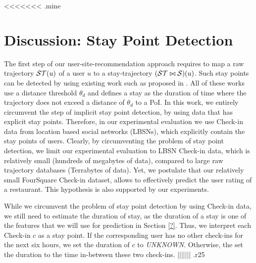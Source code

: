 <<<<<<< .mine
\section{Discussion: Stay Point Detection}\label{sec:stay}
The first step of our user-site-recommendation approach requires to map a raw trajectory $\mathcal{ST}(u)$ of a user $u$ to a stay-trajectory $(\mathcal{ST}\bowtie\mathcal{S})(u)$. Such stay points can be detected by using existing work such as proposed in \cite{li2008mining,zheng2009mining,zheng2010geolife,xiao2010finding}. All of these works use a distance threshold $\theta_{d}$ and defines a stay as the duration of time where the trajectory does not exceed a distance of $\theta_{d}$ to a PoI. In this work, we entirely circumvent the step of implicit stay point detection, by using data that has explicit stay points. Therefore, in our experimental evaluation we use Check-in data from location based social networks (LBSNs), which explicitly contain the stay points of users. Clearly, by circumventing the problem of stay point detection, we limit our experimental evaluation to LBSN Check-in data, which is relatively small (hundreds of megabytes of data), compared to large raw trajectory databases (Terrabytes of data).
Yet, we postulate that our relatively small FourSquare Check-in dataset, allows to effectively predict the user rating of a restaurant. This hypothesis is also supported by our experiments.

While we circumvent the problem of stay point detection by using Check-in data, we still need to estimate the duration of stay, as the duration of a stay is one of the features that we will use for prediction in Section \ref{?}. Thus, we interpret each Check-in $c$ as a stay point. If the corresponding user has no other check-ins for the next six hours, we set the duration of $c$ to \emph{UNKNOWN}. Otherwise, the set the duration to the time in-between these two check-ins.   ||||||| .r25
